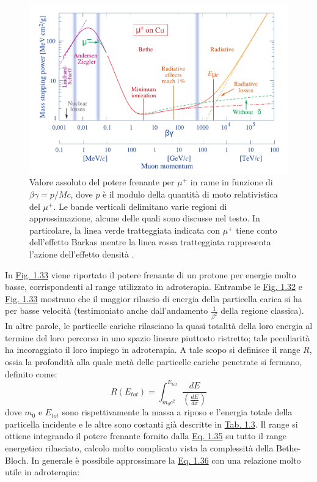 \documentclass[12pt,a4paper,twoside]{report}
\begin{document}
	\begin{figure}[H]
		\centering
		\includegraphics[width=0.9\linewidth]{bethe_bloch.pdf}
		\caption{Valore assoluto del potere frenante per $\mu^+$ in rame in funzione di $\beta\gamma=p/Mc$, dove $p$ è il modulo della quantità di moto relativistica del $\mu^+$. Le bande verticali delimitano varie regioni di approssimazione, alcune delle quali sono discusse nel testo. In particolare, la linea verde tratteggiata indicata con $\mu^+$ tiene conto dell'effetto Barkas mentre la linea rossa tratteggiata rappresenta l'azione dell'effetto densità \cite{groomPassage}.}
		\label{fig:bethe_bloch}
	\end{figure}
	In \hyperref[fig:adroterapic_range]{Fig. 1.33} viene riportato il potere frenante di un protone per energie molto basse, corrispondenti al range utilizzato in adroterapia. Entrambe le \hyperref[fig:bethe_bloch]{Fig. 1.32} e \hyperref[fig:adroterapic_range]{Fig. 1.33} mostrano che il maggior rilascio di energia della particella carica si ha per basse velocità (testimoniato anche dall'andamento $\frac{1}{\beta^2}$ della regione classica). In altre parole, le particelle cariche rilasciano la quasi totalità della loro energia al termine del loro percorso in uno spazio lineare piuttosto ristretto; tale peculiarità ha incoraggiato il loro impiego in adroterapia. A tale scopo si definisce il range $R$, ossia la profondità alla quale metà delle particelle cariche penetrate si fermano, definito come:
	\begin{equation}
		R(E_{tot})=\int_{m_0c^2}^{E_{tot}}\frac{dE}{\left(\frac{dE}{dx}\right)}
		\label{eq:range}
	\end{equation}
	dove $m_0$ e $E_{tot}$ sono rispettivamente la massa a riposo e l'energia totale della particella incidente e le altre sono costanti già descritte in \hyperref[tab:bethe_bloch]{Tab. 1.3}. Il range si ottiene integrando il potere frenante fornito dalla \hyperref[eq:bethe_bloch]{Eq. 1.35} su tutto il range energetico rilasciato, calcolo molto complicato vista la complessità della Bethe-Bloch. In generale è possibile approssimare la \hyperref[eq:range]{Eq. 1.36} con una relazione molto utile in adroterapia:
\end{document}
